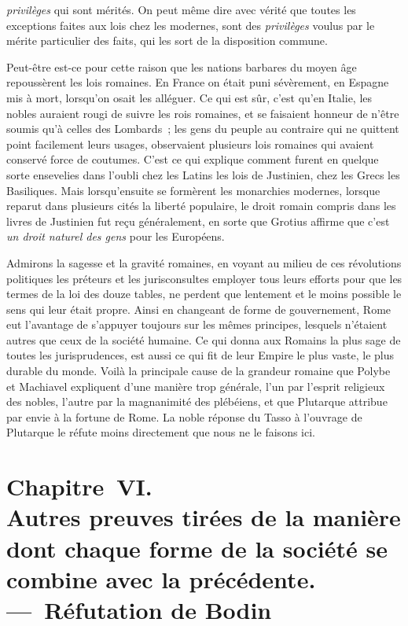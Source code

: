 \documentclass[french,twoside]{book} %
\newcommand\chapteropen{} %
\newcommand\chapterclose{} %
\begin{document}
{\itshape privilèges} qui sont mérités. On peut même dire avec vérité que toutes les exceptions faites aux lois chez les modernes, sont des {\itshape privilèges} voulus par le mérite particulier des faits, qui les sort de la disposition commune.\par
Peut-être est-ce pour cette raison que les nations barbares du moyen âge repoussèrent les lois romaines. En France on était puni sévèrement, en Espagne mis à mort, lorsqu’on osait les alléguer. Ce qui est sûr, c’est qu’en Italie, les nobles auraient rougi de suivre les rois romaines, et se faisaient honneur de n’être soumis qu’à celles des Lombards ; les gens du peuple au contraire qui ne quittent point facilement leurs usages, observaient plusieurs lois romaines qui avaient conservé force de coutumes. C’est ce qui explique comment furent  en quelque sorte ensevelies dans l’oubli chez les Latins les lois de Justinien, chez les Grecs les Basiliques. Mais lorsqu’ensuite se formèrent les monarchies modernes, lorsque reparut dans plusieurs cités la liberté populaire, le droit romain compris dans les livres de Justinien fut reçu généralement, en sorte que Grotius affirme que c’est {\itshape un droit naturel des gens} pour les Européens.\par
Admirons la sagesse et la gravité romaines, en voyant au milieu de ces révolutions politiques les préteurs et les jurisconsultes employer tous leurs efforts pour que les termes de la loi des douze tables, ne perdent que lentement et le moins possible le sens qui leur était propre. Ainsi en changeant de forme de gouvernement, Rome eut l’avantage de s’appuyer toujours sur les mêmes principes, lesquels n’étaient autres que ceux de la société humaine. Ce qui donna aux Romains la plus sage de toutes les jurisprudences, est aussi ce qui fit de leur Empire le plus vaste, le plus durable du monde. Voilà la principale cause de la grandeur romaine que Polybe et Machiavel expliquent d’une manière trop générale, l’un par l’esprit religieux des nobles, l’autre par la magnanimité des plébéiens, et que Plutarque attribue par envie à la fortune de Rome. La noble réponse du Tasso à l’ouvrage de Plutarque le réfute moins directement que nous ne le faisons ici.
\chapterclose


\chapteropen
\chapter[{Chapitre VI. Autres preuves tirées de la manière dont chaque forme de la société se combine avec la précédente. — Réfutation de Bodin}]{Chapitre VI. \\
Autres preuves tirées de la manière dont chaque forme de la société se combine avec la précédente. — Réfutation de Bodin}
\end{document}
